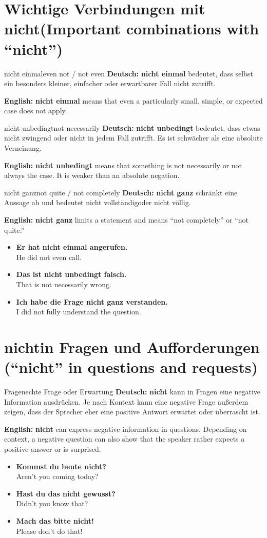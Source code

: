 \documentclass[a4paper,11pt]{article}
\newcommand{\GermanText}[1]{\textbf{Deutsch: }#1\par}
\newcommand{\EnglishText}[1]{{\small\color{SoftGray}\textbf{English: }#1\par}}
\newcommand{\ExampleItem}[2]{\item \textbf{#1}\\{\small\color{SoftGray}#2}}
\begin{document}
\section{Wichtige Verbindungen mit \glqq nicht\grqq \textnormal{(Important combinations with ``nicht'')}}
\begin{grammarentry}{nicht einmal}{even not / not even}
\GermanText{\textbf{nicht einmal} bedeutet, dass selbst ein besonders kleiner, einfacher oder erwartbarer Fall nicht zutrifft.}
\EnglishText{\textbf{nicht einmal} means that even a particularly small, simple, or expected case does not apply.}
\end{grammarentry}
\begin{grammarentry}{nicht unbedingt}{not necessarily}
\GermanText{\textbf{nicht unbedingt} bedeutet, dass etwas nicht zwingend oder nicht in jedem Fall zutrifft. Es ist schwächer als eine absolute Verneinung.}
\EnglishText{\textbf{nicht unbedingt} means that something is not necessarily or not always the case. It is weaker than an absolute negation.}
\end{grammarentry}
\begin{grammarentry}{nicht ganz}{not quite / not completely}
\GermanText{\textbf{nicht ganz} schränkt eine Aussage ab und bedeutet \glqq nicht vollständig\grqq oder \glqq nicht völlig\grqq.}
\EnglishText{\textbf{nicht ganz} limits a statement and means ``not completely'' or ``not quite.''}
\end{grammarentry}
\begin{exbox}\begin{itemize}
\ExampleItem{Er hat nicht einmal angerufen.}{He did not even call.}
\ExampleItem{Das ist nicht unbedingt falsch.}{That is not necessarily wrong.}
\ExampleItem{Ich habe die Frage nicht ganz verstanden.}{I did not fully understand the question.}
\end{itemize}\end{exbox}

\section{\glqq nicht\grqq in Fragen und Aufforderungen \textnormal{(``nicht'' in questions and requests)}}
\begin{grammarentry}{Fragen}{echte Frage oder Erwartung}
\GermanText{\textbf{nicht} kann in Fragen eine negative Information ausdrücken. Je nach Kontext kann eine negative Frage außerdem zeigen, dass der Sprecher eher eine positive Antwort erwartet oder überrascht ist.}
\EnglishText{\textbf{nicht} can express negative information in questions. Depending on context, a negative question can also show that the speaker rather expects a positive answer or is surprised.}
\end{grammarentry}
\begin{exbox}\begin{itemize}
\ExampleItem{Kommst du heute nicht?}{Aren't you coming today?}
\ExampleItem{Hast du das nicht gewusst?}{Didn't you know that?}
\ExampleItem{Mach das bitte nicht!}{Please don't do that!}
\end{itemize}\end{exbox}
\end{document}
